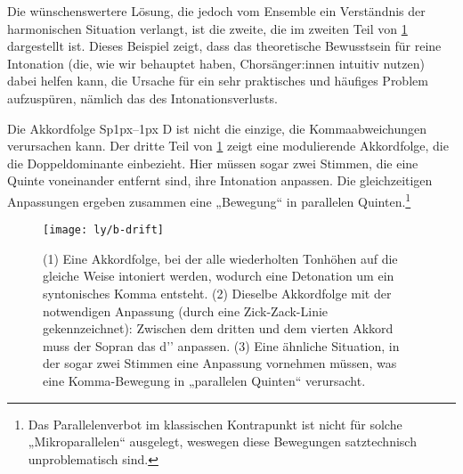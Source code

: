 Die wünschenswertere Lösung, die jedoch vom Ensemble ein Verständnis der
harmonischen Situation verlangt, ist die zweite, die im zweiten Teil von
\cref{fig:drift} dargestellt ist. Dieses Beispiel zeigt, dass das theoretische
Bewusstsein für reine Intonation (die, wie wir behauptet haben, Chorsänger:innen
intuitiv nutzen) dabei helfen kann, die Ursache für ein sehr praktisches und
häufiges Problem aufzuspüren, nämlich das des Intonationsverlusts.

Die Akkordfolge Sp\kern1px–\kern1px D ist nicht die einzige, die
Kommaabweichungen verursachen kann. Der dritte Teil von \cref{fig:drift} zeigt
eine modulierende Akkordfolge, die die Doppeldominante einbezieht. Hier müssen
sogar zwei Stimmen, die eine Quinte voneinander entfernt sind, ihre Intonation
anpassen. Die gleichzeitigen An\-passungen ergeben zusammen eine „Bewegung“ in
parallelen Quinten.\footnote{Das Parallelenverbot im klassischen Kontrapunkt ist
  nicht für solche „Mikroparallelen“ ausgelegt, weswegen diese Bewegungen
  satztechnisch unproblematisch sind.}

\begin{figure}
  \centering
  \texttt{[image: ly/b-drift]}
  \caption{(1) Eine Akkordfolge, bei der alle wiederholten Tonhöhen auf die   
  	gleiche Weise intoniert werden, wodurch eine Detonation um ein syntonisches
  	Komma entsteht.%
  	\quad (2) Dieselbe Akkordfolge mit der notwendigen Anpassung (durch eine
  	Zick-Zack-Linie gekennzeichnet): Zwischen dem dritten und dem vierten Akkord
  	muss der Sopran das d’’ anpassen.%
  	\quad (3) Eine ähnliche Situation, in der sogar zwei Stimmen eine Anpassung
  	vornehmen müssen, was eine Komma-Bewegung in „parallelen Quinten“
  	verursacht.}\label{fig:drift}
\end{figure}

